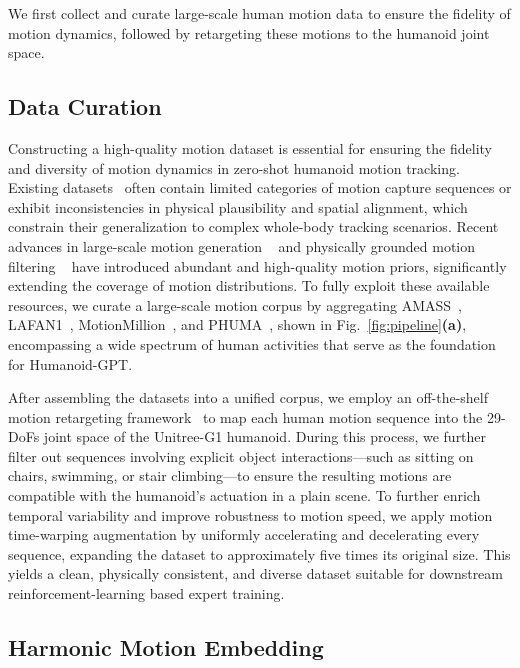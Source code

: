 \documentclass{llmxive}
\providecommand{\methodname}{Humanoid-GPT\xspace}
\begin{document}
We first collect and curate large-scale human motion data to ensure the fidelity of motion dynamics, followed by retargeting these motions to the humanoid joint space.

\subsection{Data Curation}
\label{subsec:method_data}
Constructing a high-quality motion dataset is essential for ensuring the fidelity and diversity of motion dynamics in zero-shot humanoid motion tracking. Existing datasets~\cite{amass19, lafan20, motionx23, humanoidx24} often contain limited categories of motion capture sequences or exhibit inconsistencies in physical plausibility and spatial alignment, which constrain their generalization to complex whole-body tracking scenarios. Recent advances in large-scale motion generation ~\cite{motionmillion25} and physically grounded motion filtering ~\cite{phuma25} have introduced abundant and high-quality motion priors, significantly extending the coverage of motion distributions. To fully exploit these available resources, we curate a large-scale motion corpus by aggregating AMASS~\cite{amass19}, LAFAN1~\cite{lafan20}, MotionMillion~\cite{motionmillion25}, and PHUMA~\cite{phuma25}, shown in Fig.~\ref{fig:pipeline}\textbf{(a)}, encompassing a wide spectrum of human activities that serve as the foundation for \methodname.

After assembling the datasets into a unified corpus, we employ an off-the-shelf motion retargeting framework~\cite{gmr25} to map each human motion sequence into the 29-DoFs joint space of the Unitree-G1 humanoid. During this process, we further filter out sequences involving explicit object interactions—such as sitting on chairs, swimming, or stair climbing—to ensure the resulting motions are compatible with the humanoid’s actuation in a plain scene. To further enrich temporal variability and improve robustness to motion speed, we apply motion time-warping augmentation by uniformly accelerating and decelerating every sequence, expanding the dataset to approximately five times its original size. This yields a clean, physically consistent, and diverse dataset suitable for downstream reinforcement-learning based expert training.


\subsection{Harmonic Motion Embedding}
\end{document}

